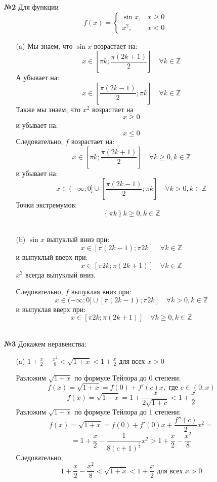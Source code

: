 \documentclass[a4paper]{article}
\renewcommand{\f}[2]{\frac{#1}{#2}}
\renewcommand{\geq}{\geqslant}
\renewcommand{\leq}{\leqslant}
\newcommand{\ZZ}{\mathbb{Z}}
\begin{document}
\begin{enumerate}
    \item[\textbf{№2}]Для функции 
    $$
    f(x)=\left\{\begin{array}{ll}
    \sin x, & x \geqslant 0 \\
    x^{2}, & x<0
    \end{array}\right.
    $$
    \begin{enumerate}
        \item[(a)]Мы знаем, что $\sin x$ возрастает на:
        $$x \in [\pi k; \f{\pi (2k+1)}{2}] \quad \forall k\in \ZZ$$
        А убывает на:
        $$x \in [\f{\pi (2k-1)}{2}; \pi k] \quad \forall k\in \ZZ$$
        Также мы знаем, что $x^2$ возрастает на $$x\geq 0$$
        и убывает на:
        $$x \leq 0$$
        Следовательно, $f$ возрастает на:
        $$x \in [\pi k; \f{\pi (2k+1)}{2}]\quad  \forall k\geq0, k\in \ZZ$$
        и убывает на:
        $$x \in (-\infty;0]\cup[\f{\pi (2k-1)}{2}; \pi k] \quad \forall k>0,k \in \ZZ$$
        Точки экстремумов:
        $$\left\{\pi k \right\} k\geq0, k \in \ZZ$$\\
        
        \item[(b)]$\sin x$ выпуклый вниз при:
        $$x \in [\pi (2k-1); \pi 2k] \quad \forall k\in \ZZ$$
        и выпуклый вверх при:
        $$x \in [\pi 2k; \pi (2k+1)] \quad \forall k\in \ZZ$$
        $x^2$ всегда выпуклый вниз.

        Следовательно, $f$ выпуклая вниз при:
        $$x\in (-\infty;0]\cup[\pi (2k-1); \pi 2k]  \quad \forall k>0, k\in \ZZ$$
        и выпуклая вверх при:
        $$x \in [\pi 2k; \pi (2k+1)] \quad \forall k\geq0, k\in \ZZ$$\\

    \end{enumerate}

    \item[\textbf{№3}]Докажем неравенства:
    \begin{enumerate}
        \item[(a)]$1+\frac{x}{2}-\frac{x^{2}}{8}<\sqrt{1+x}<1+\frac{x}{2}$ для всех $x>0$
        
        Разложим $\sqrt{1+x}$ по формуле Тейлора до 0 степени:
        $$f(x) = \sqrt{1+x} = f(0)+f'(c)x, \text{ где $c \in (0, x)$} $$
        $$f(x) = \sqrt{1+x} = 1+\f{x}{2\sqrt{1+c}} < 1+\f{x}{2}$$
        Разложим $\sqrt{1+x}$ по формуле Тейлора до 1 степени:
        $$f(x) = \sqrt{1+x} = f(0)+f'(0)x+\f{f''(c)}{2}x^2 = $$
        $$=1+\f{x}{2}-\f{1}{8(c+1)^{\f{3}{2}}}x^2 > 1+\frac{x}{2}-\frac{x^{2}}{8}$$
        Следовательно,
        $$1+\frac{x}{2}-\frac{x^{2}}{8}<\sqrt{1+x}<1+\frac{x}{2} \text{ для всех $x>0$}$$


\end{enumerate}
\end{enumerate}
\end{document}
